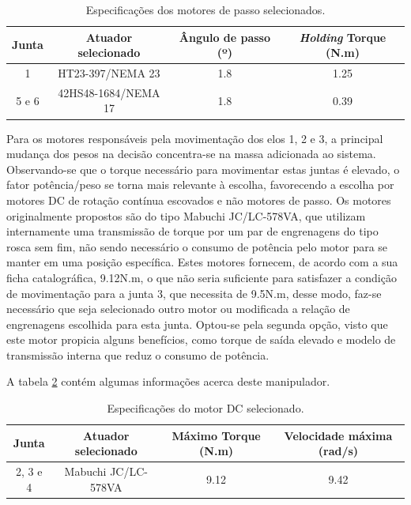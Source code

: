 \begin{table}[h]
\begin{centering}  

\begin{tabular}{|c|c|c|c|}
    \hline
    Junta & Atuador selecionado & Ângulo de passo (º) & \textit{Holding} Torque (N.m)\tabularnewline
    \hline
    \hline
    1 & HT23-397/NEMA 23 & 1.8 & 1.25 \tabularnewline
    \hline
    5 e 6 & 42HS48-1684/NEMA 17 & 1.8 & 0.39 \tabularnewline
    \hline
\end{tabular}

\caption{Especificações dos motores de passo selecionados.}
\label{tab:SelecaoPasso}

\par\end{centering}
\end{table}  

Para os motores responsáveis pela movimentação dos elos 1, 2 e 3, a 
principal mudança dos pesos na decisão concentra-se na massa adicionada 
ao sistema. Observando-se que o torque necessário para movimentar estas 
juntas é elevado, o fator potência/peso se torna mais relevante 
à escolha, favorecendo a escolha por motores DC de rotação contínua 
escovados e não motores de passo. 
Os motores originalmente propostos são do tipo Mabuchi JC/LC-578VA, 
que utilizam internamente uma transmissão de torque por um 
par de engrenagens do tipo rosca sem fim, não sendo necessário o consumo 
de potência pelo motor para se manter em uma posição específica. Estes 
motores fornecem, de acordo com a sua ficha catalográfica, 9.12N.m, o que 
não seria suficiente para satisfazer a condição de movimentação para a 
junta 3, que necessita de 9.5N.m, desse modo, faz-se necessário que seja 
selecionado outro motor ou modificada a relação de engrenagens escolhida 
para esta junta. Optou-se pela segunda opção, visto que este motor 
propicia alguns benefícios, como torque de saída elevado e modelo de 
transmissão interna que reduz o consumo de potência.

A tabela \ref{tab:SelecaoDC} contém algumas informações acerca deste manipulador.

\begin{table}[h]
\begin{centering}  

\begin{tabular}{|c|c|c|c|}
    \hline
    Junta & Atuador selecionado & Máximo Torque (N.m) & Velocidade máxima (rad/s)\tabularnewline
    \hline
    \hline
    2, 3 e 4 & Mabuchi JC/LC-578VA & 9.12 & 9.42 \tabularnewline
    \hline
\end{tabular}

\caption{Especificações do motor DC selecionado.}
\label{tab:SelecaoDC}

\par\end{centering}
\end{table}  
